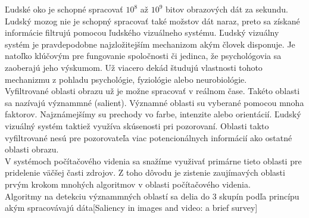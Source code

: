 
Ľudské oko je schopné spracovať \begin{math}10^8\end{math} až \begin{math}10^9\end{math} bitov obrazových
dát za sekundu. Ludský mozog nie je schopný spracovať také možstov dát naraz,
preto sa získané informácie filtrujú pomocou ľudského vizuálneho systému. Ľudský vizuálny systém
je pravdepodobne najzložitejším mechanizom akým človek disponuje. Je natoľko klúčovým pre fungovanie spoločnosti či jedinca, že
psychológovia sa zaoberajú jeho výskumom. Už viacero dekád študujú vlastnosti tohoto
mechanizmu z pohladu psychológie, fyziológie alebo neurobiológie. \\

Vyfiltrované oblasti obrazu už je možne spracovať v reálnom čase. Takéto oblasti sa nazívajú
význammné (salient). Významné oblasti su vyberané pomocou mnoha faktorov. Najznámejšímy su prechody
vo farbe, intenzite alebo orientácií. Ľudský vizuálný systém taktiež využíva
skúsenosti pri pozorovaní. Oblasti takto vyfiltrované nesú pre pozorovateľa
viac potencionálnych informácií ako ostatné oblasti obrazu. \\

V systémoch počítačového videnia sa snažíme využivať primárne tieto oblasti pre
pridelenie väčšej časti zdrojov. Z toho dôvodu je zistenie zaujímavých oblasti
prvým krokom mnohých algoritmov v oblasti počítačového videnia.\\

Algoritmy na detekciu význammných oblastí sa delia do 3 skupín podľa princípu
akým spracovávajú dáta[Saliency in images and video: a brief survey]

